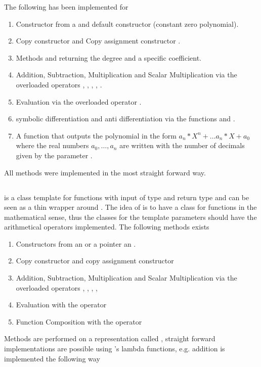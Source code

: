 			The following has been implemented for \poly
			\begin{enumerate}
				\item Constructor from a  and default constructor (constant zero polynomial).
				\item Copy constructor  and Copy assignment constructor .
				\item Methods  and  returning the degree and a specific coefficient.
				\item Addition, Subtraction, Multiplication and Scalar Multiplication via the overloaded operators \code{+}, \code{-}, 	\code{*}, \code{+=}, \code{*=}.
				\item Evaluation via the overloaded operator \code{()}.
				\item symbolic differentiation and anti differentiation via the functions  and .
				\item A function  that outputs the polynomial
				in the form $a_n*X^n+ \dots a_n*X + a_0$ where the real numbers $a_0, \dots, a_n$ are written with the number of decimals given by the parameter .
			\end{enumerate}
			All methods were implemented in the most straight forward way. 
		\subsection{\func}
			\textbf{} is a class template for functions with input 
			of type  and return type  and can be seen as a thin wrapper around .
			The idea of \func is to have a class for functions in the mathematical sense, thus the classes for the template
			parameters should have the arithmetical operators implemented.
			The following methods exists
			\begin{enumerate}
				\item Constructors from an  or a pointer an .
				\item  Copy constructor  and copy assignment constructor 
				\item Addition, Subtraction, Multiplication and Scalar Multiplication via the overloaded operators \code{+}, \code{-}, 	\code{*}, \code{+=}, \code{*=}
				\item Evaluation with the operator \code{()}
				\item Function Composition with the operator \code{()}
			\end{enumerate}
			Methods are performed on a representation called , straight forward implementations
			are possible using {\ccx}'s lambda functions, e.g. addition is implemented the following way
			
